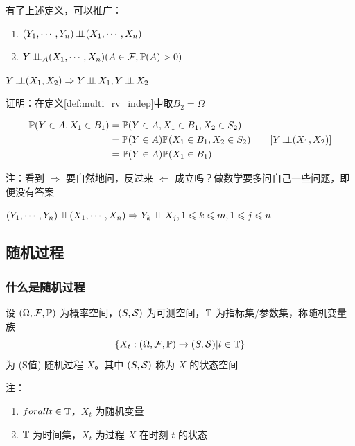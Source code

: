 有了上述定义，可以推广：

\begin{enumerate}
    \item $(Y_1,\cdots,Y_n)\operatorname{\perp\!\!\!\perp} (X_1,\cdots,X_n)$
    \item $Y\operatorname{\perp\!\!\!\perp}_A (X_1,\cdots,X_n) (A\in \mathcal{F},\mathbb{P}(A)>0)$
\end{enumerate}

\begin{property}\label{prop:pairwise_indep}
    $Y\ind (X_1,X_2)\Rightarrow Y\ind X_1,Y\ind X_2$
\end{property}

证明：在定义\ref{def:multi_rv_indep}中取$B_2=\Omega$

\[
\begin{aligned}
    \mathbb{P}(Y\in A,X_1\in B_1)&=\mathbb{P}(Y\in A,X_1\in B_1,X_2\in S_2)\\
    &=\mathbb{P}(Y\in A)\mathbb{P}(X_1\in B_1,X_2\in S_2)\qquad [Y\operatorname{\perp\!\!\!\perp} (X_1,X_2)]\\
    &=\mathbb{P}(Y\in A)\mathbb{P}(X_1\in B_1)
\end{aligned}
\]

注：看到 $\Rightarrow$ 要自然地问，反过来 $\Leftarrow$ 成立吗？做数学要多问自己一些问题，即便没有答案

\begin{corollary}
    $(Y_1,\cdots,Y_n)\operatorname{\perp\!\!\!\perp} (X_1,\cdots,X_n)\Rightarrow Y_k\operatorname{\perp\!\!\!\perp} X_j, 1\leqslant k\leqslant m,1\leqslant j\leqslant n$
\end{corollary}

\subsection{随机过程}

\subsubsection{什么是随机过程}

\begin{definition}[随机过程]
    设 $(\Omega, \mathcal{F}, \mathbb{P})$ 为概率空间，$(S,\mathcal{S})$ 为可测空间，$\mathbb{T}$ 为指标集/参数集，称随机变量族
    \[
    \{X_t: (\Omega,\mathcal{F},\mathbb{P})\rightarrow (S,\mathcal{S})|t\in \mathbb{T}\}
    \]
    为 (S值) 随机过程 $X$。其中 $(S,\mathcal{S})$ 称为 $X$ 的状态空间

    注：\begin{enumerate}
        \item $forall t\in \mathbb{T}$，$X_t$ 为随机变量
        \item $\mathbb{T}$ 为时间集，$X_t$ 为过程 $X$ 在时刻 $t$ 的状态
    \end{enumerate}
\end{definition}

